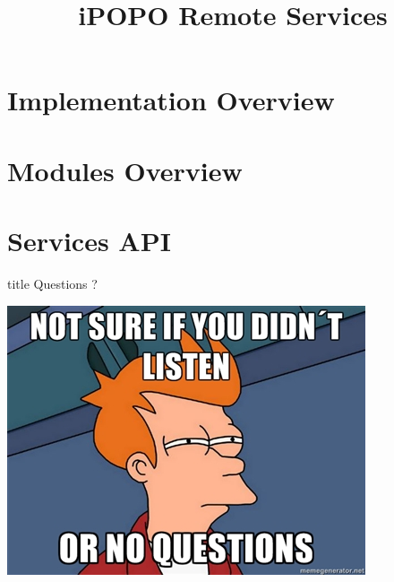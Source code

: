 \documentclass{beamer}
\title[Remote Services]{iPOPO Remote Services}
\begin{document}
\frame{\titlepage}

\section{Implementation Overview}


\section{Modules Overview}


\section{Services API}


\begin{frame}
  \vfill
  \centering
  \begin{beamercolorbox}[sep=8pt,center,shadow=true,rounded=true]{title}
    Questions ?\par%
  \end{beamercolorbox}
  \vspace{3ex}
  \includegraphics[width=.5\textwidth]{../imgs/questions_fry}
  \vfill
\end{frame}
\end{document}
